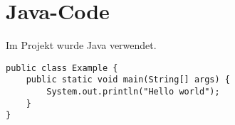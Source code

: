 
\section{Java-Code}
Im Projekt wurde Java verwendet.

\begin{verbatim}
public class Example {
    public static void main(String[] args) {
        System.out.println("Hello world");
    }
}
\end{verbatim}